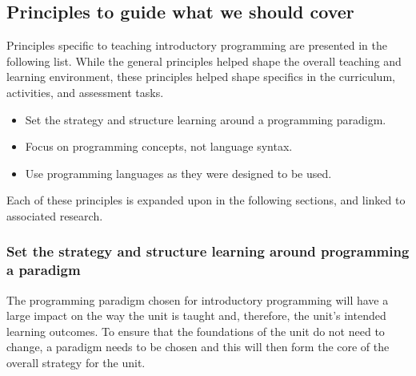 








\clearpage
\subsection{Principles to guide what we should cover} %
\label{sec:principles_to_guide_what_we_should_cover}

Principles specific to teaching introductory programming are presented in the following list. While the general principles helped shape the overall teaching and learning environment, these principles helped shape specifics in the curriculum, activities, and assessment tasks.

\begin{itemize}
	\item Set the strategy and structure learning around a programming paradigm.
	\item Focus on programming concepts, not language syntax.
	\item Use programming languages as they were designed to be used.
\end{itemize}

Each of these principles is expanded upon in the following sections, and linked to associated research.


\subsubsection{Set the strategy and structure learning around programming a paradigm} %
\label{ssub:set_the_strategy_and_structure_learning_around_programming_a_paradigm}

The programming paradigm chosen for introductory programming will have a large impact on the way the unit is taught and, therefore, the unit's intended learning outcomes. To ensure that the foundations of the unit do not need to change, a paradigm needs to be chosen and this will then form the core of the overall strategy for the unit.

